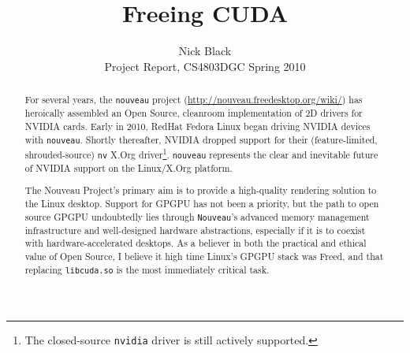 \documentclass[letterpaper,10pt]{article}
\title{Freeing CUDA}
\author{Nick Black\\
Project Report, CS4803DGC Spring 2010}
\date{}
\begin{document}
\maketitle

\begin{abstract}
For several years, the \texttt{nouveau} project (\url{http://nouveau.freedesktop.org/wiki/})
has heroically assembled an Open Source, cleanroom implementation of 2D drivers for
NVIDIA cards\cite{nouveaustatus}. Early in 2010, RedHat Fedora Linux began driving
NVIDIA devices with \texttt{nouveau}. Shortly thereafter, NVIDIA dropped
support for their (feature-limited, shrouded-source) \texttt{nv} X.Org driver\footnote{The
closed-source \texttt{nvidia} driver is still actively supported.}. \texttt{nouveau} represents
the clear and inevitable future of NVIDIA support on the Linux/X.Org platform.

The Nouveau Project's primary aim is to provide a high-quality rendering
solution to the Linux desktop. Support for GPGPU has not been a priority, but
the path to open source GPGPU undoubtedly lies through
\texttt{Nouveau}'s advanced memory management infrastructure and well-designed hardware
abstractions, especially if it is to coexist with hardware-accelerated desktops.
As a believer in both the practical and ethical value of Open Source, I believe
it high time Linux's GPGPU stack was Freed, and that replacing \texttt{libcuda.so}
is the most immediately critical task.
\end{abstract}
\end{document}
